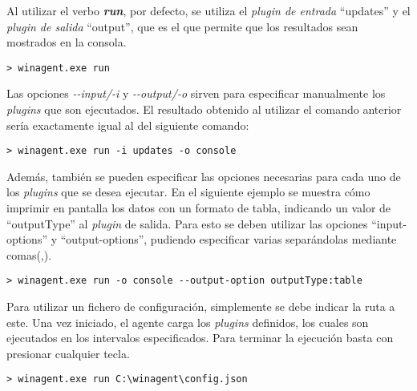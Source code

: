             Al utilizar el verbo \textbf{\textit{run}}, por defecto, se utiliza el \textit{plugin de entrada} ``updates'' y el \textit{plugin de salida} ``output'', que es el que permite que los resultados sean mostrados en la consola.
            
            \begin{lstlisting}[style=batch, caption=Ejecución por defecto]
                > winagent.exe run
            \end{lstlisting}
            
            Las opciones \textit{-{}-input/-i} y \textit{-{}-output/-o} sirven para especificar manualmente los \textit{plugins} que son ejecutados. El resultado obtenido al utilizar el comando anterior sería exactamente igual al del siguiente comando:
            
            \begin{lstlisting}[style=batch, caption=Ejecución de forma manual]
                > winagent.exe run -i updates -o console
            \end{lstlisting}
            
            Además, también se pueden especificar las opciones necesarias para cada uno de los \textit{plugins} que se desea ejecutar. En el siguiente ejemplo se muestra cómo imprimir en pantalla los datos con un formato de tabla, indicando un valor de ``outputType'' al \textit{plugin} de salida. Para esto se deben utilizar las opciones ``input-options'' y ``output-options'', pudiendo especificar varias separándolas mediante comas(,).
            
            \begin{lstlisting}[style=batch, caption=Ejecución de forma manual]
                > winagent.exe run -o console --output-option outputType:table
            \end{lstlisting}

            Para utilizar un fichero de configuración, simplemente se debe indicar la ruta a este. Una vez iniciado, el agente carga los \textit{plugins} definidos, los cuales son ejecutados en los intervalos especificados. Para terminar la ejecución basta con presionar cualquier tecla.
            
            \begin{lstlisting}[style=batch, caption=Ejecución utilizando un fichero de configuración]
                > winagent.exe run C:\winagent\config.json
            \end{lstlisting}
        
